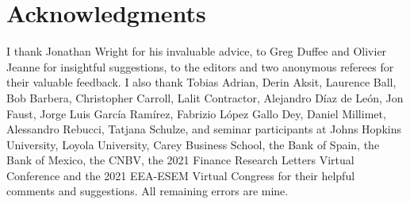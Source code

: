 \documentclass[a4paper, 12pt]{article}
\begin{document}
\section*{Acknowledgments}
\begin{spacing}{1.25} 
I thank Jonathan Wright for his invaluable advice, to Greg Duffee and Olivier Jeanne for insightful suggestions, to the editors and two anonymous referees for their valuable feedback. I also thank Tobias Adrian, Derin Aksit, Laurence Ball, Bob Barbera, Christopher Carroll, Lalit Contractor, Alejandro Díaz de León, Jon Faust, Jorge Luis García Ramírez, Fabrizio López Gallo Dey, Daniel Millimet, Alessandro Rebucci, Tatjana Schulze, and seminar participants at Johns Hopkins University, Loyola University, Carey Business School, the Bank of Spain, the Bank of Mexico, the CNBV, the 2021 Finance Research Letters Virtual Conference and the 2021 EEA-ESEM Virtual Congress for their helpful comments and suggestions. All remaining errors are mine. 
\end{spacing}

\newpage

	
\end{document}
